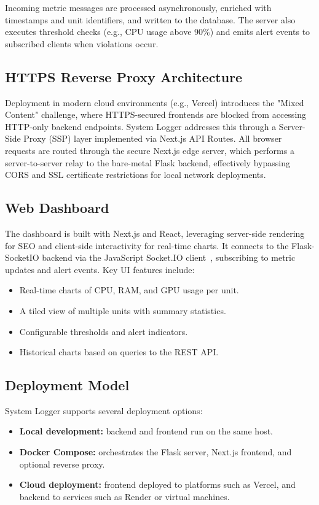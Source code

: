 \documentclass[conference]{IEEEtran}
\begin{document}
Incoming metric messages are processed asynchronously, enriched with timestamps and unit identifiers, and written to the database. The server also executes threshold checks (e.g., CPU usage above 90\%) and emits alert events to subscribed clients when violations occur.

\subsection{HTTPS Reverse Proxy Architecture}

Deployment in modern cloud environments (e.g., Vercel) introduces the "Mixed Content" challenge, where HTTPS-secured frontends are blocked from accessing HTTP-only backend endpoints. System Logger addresses this through a Server-Side Proxy (SSP) layer implemented via Next.js API Routes. All browser requests are routed through the secure Next.js edge server, which performs a server-to-server relay to the bare-metal Flask backend, effectively bypassing CORS and SSL certificate restrictions for local network deployments.

\subsection{Web Dashboard}

The dashboard is built with Next.js and React, leveraging server-side rendering for SEO and client-side interactivity for real-time charts. It connects to the Flask-SocketIO backend via the JavaScript Socket.IO client~\cite{socketioDocs}, subscribing to metric updates and alert events. Key UI features include:
\begin{itemize}
  \item Real-time charts of CPU, RAM, and GPU usage per unit.
  \item A tiled view of multiple units with summary statistics.
  \item Configurable thresholds and alert indicators.
  \item Historical charts based on queries to the REST API.
\end{itemize}

\subsection{Deployment Model}

System Logger supports several deployment options:
\begin{itemize}
  \item \textbf{Local development:} backend and frontend run on the same host.
  \item \textbf{Docker Compose:} orchestrates the Flask server, Next.js frontend, and optional reverse proxy.
  \item \textbf{Cloud deployment:} frontend deployed to platforms such as Vercel, and backend to services such as Render or virtual machines.
\end{itemize}
\end{document}
